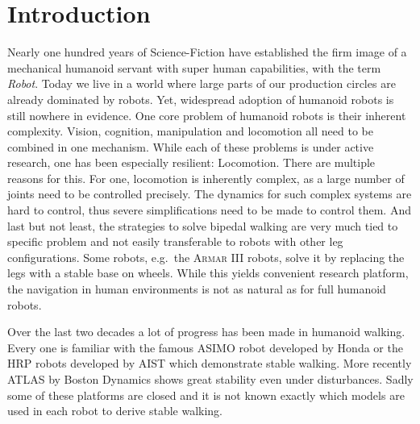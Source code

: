 \documentclass[english,ngerman]{KITreprt}
\newcommand{\name}[1]{\textsc{#1}}
\begin{document}



\maketitle

\tableofcontents

\chapter{Introduction}\label{introduction}

Nearly one hundred years of Science-Fiction have established the firm
image of a mechanical humanoid servant with super human capabilities,
with the term \emph{Robot}. Today we live in a world where large parts
of our production circles are already dominated by robots. Yet,
widespread adoption of humanoid robots is still nowhere in evidence. One
core problem of humanoid robots is their inherent complexity. Vision,
cognition, manipulation and locomotion all need to be combined in one
mechanism. While each of these problems is under active research, one
has been especially resilient: Locomotion. There are multiple reasons
for this. For one, locomotion is inherently complex, as a large number
of joints need to be controlled precisely. The dynamics for such complex
systems are hard to control, thus severe simplifications need to be made
to control them. And last but not least, the strategies to solve bipedal
walking are very much tied to specific problem and not easily
transferable to robots with other leg configurations. Some robots,
e.g.~the \name{Armar III} robots, solve it by replacing the legs with a
stable base on wheels. While this yields convenient research platform,
the navigation in human environments is not as natural as for full
humanoid robots.

Over the last two decades a lot of progress has been made in humanoid
walking. Every one is familiar with the famous \name{ASIMO} robot
developed by Honda or the \name{HRP} robots developed by \name{AIST}
which demonstrate stable walking. More recently \name{ATLAS} by Boston
Dynamics shows great stability even under disturbances. Sadly some of
these platforms are closed and it is not known exactly which models are
used in each robot to derive stable walking.
\end{document}
